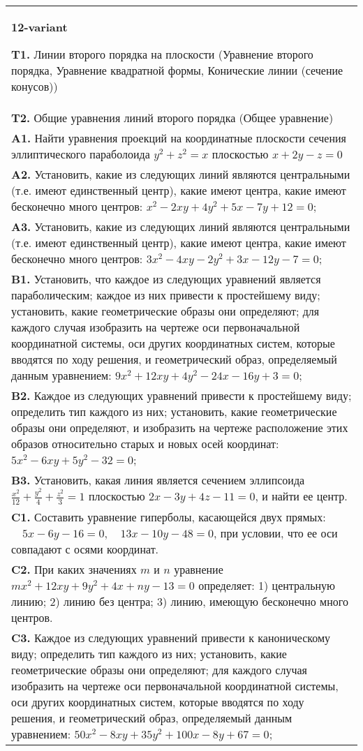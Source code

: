 \documentclass{article}
\begin{document}
\begin{tabular}{m{17cm}}
\textbf{12-variant}
\newline

\textbf{T1.} Линии второго порядка на плоскости (Уравнение второго порядка, Уравнение квадратной формы, Конические линии (сечение конусов)) \\
\textbf{T2.} Общие уравнения линий второго порядка (Общее уравнение) \\
\textbf{A1.} Найти уравнения проекций на координатные плоскости сечения эллиптического параболоида $y^2+z^2=x$ плоскостью $x+2 y-z=0$ \\
\textbf{A2.} Установить, какие из следующих линий являются центральными (т.е. имеют единственный центр), какие имеют центра, какие имеют бесконечно много центров: $x^2-2 x y+4 y^2+5 x-7 y+12=0$; \\
\textbf{A3.} Установить, какие из следующих линий являются центральными (т.е. имеют единственный центр), какие имеют центра, какие имеют бесконечно много центров: $3 x^2-4 x y-2 y^2+3 x-12 y-7=0$; \\
\textbf{B1.} Установить, что каждое из следующих уравнений является параболическим; каждое из них привести к простейшему виду; установить, какие геометрические образы они определяют; для каждого случая изобразить на чертеже оси первоначальной координатной системы, оси других координатных систем, которые вводятся по ходу решения, и геометрический образ, определяемый данным уравнением: $9 x^2+12 x y+4 y^2-24 x-16 y+3=0$; \\
\textbf{B2.} Каждое из следующих уравнений привести к простейшему виду; определить тип каждого из них; установить, какие геометрические образы они определяют, и изобразить на чертеже расположение этих образов относительно старых и новых осей координат: $5 x^2-6 x y+5 y^2-32=0$; \\
\textbf{B3.} Установить, какая линия является сечением эллипсоида $\frac{x^2}{12}+\frac{y^2}{4}+\frac{z^2}{3}=1$ плоскостью $2 x-3 y+4 z-11=0$, и найти ее центр. \\
\textbf{C1.} Составить уравнение гиперболы, касающейся двух прямых: $\quad 5 x-6 y-16=0, \quad 13 x-10 y-48=0$, при условии, что ее оси совпадают с осями координат. \\
\textbf{C2.} При каких значениях $m$ и $n$ уравнение $m x^2+12 x y+9 y^2+4 x+n y-13=0$ определяет: 1) центральную линию; 2) линию без центра; 3) линию, имеющую бесконечно много центров. \\
\textbf{C3.} Каждое из следующих уравнений привести к каноническому виду; определить тип каждого из них; установить, какие геометрические образы они определяют; для каждого случая изобразить на чертеже оси первоначальной координатной системы, оси других координатных систем, которые вводятся по ходу решения, и геометрический образ, определяемый данным уравнением: $50 x^2-8 x y+35 y^2+100 x-8 y+67=0$; \\

\end{tabular}
\vspace{1cm}
\end{document}
